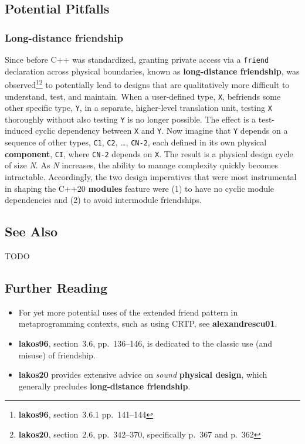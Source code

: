 \subsection[Potential Pitfalls]{Potential Pitfalls}\label{potential-pitfalls-extendedfriend}

\subsubsection[Long-distance friendship]{Long-distance friendship}\label{long-distance-friendship}

Since before C++ was standardized, granting private access via a
\texttt{friend} declaration across physical boundaries, known as
\textbf{long-distance friendship}, was
observed{\cprotect\footnote{\textbf{lakos96}, section~3.6.1
pp.~141--144}}{\cprotect\footnote{\textbf{lakos20}, section~2.6,
pp.~342--370, specifically p.~367 and p.~362}} to potentially lead
to designs that are qualitatively more difficult to understand, test,
and maintain. When a user-defined type, \texttt{X}, befriends some other
specific type, \texttt{Y}, in a separate, higher-level translation unit,
testing \texttt{X} thoroughly without also testing \texttt{Y} is no
longer possible. The effect is a test-induced cyclic dependency between
\texttt{X} and \texttt{Y}. Now imagine that \texttt{Y} depends on a
sequence of other types, \texttt{C1}, \texttt{C2}, \ldots,
\texttt{CN-2}, each defined in its own physical \textbf{component},
\texttt{CI}, where \texttt{CN-2} depends on \texttt{X}. The result is a
physical design cycle of size \emph{N}. As \emph{N} increases, the
ability to manage complexity quickly becomes intractable. Accordingly,
the two design imperatives that were most instrumental in shaping the
C++20 \textbf{modules} feature were (1) to have no cyclic module
dependencies and (2) to avoid intermodule friendships.

\subsection[See Also]{See Also}\label{see-also}

TODO

\subsection[Further Reading]{Further Reading}\label{further-reading}

\begin{itemize}
\item{For yet more potential uses of the extended friend pattern in
metaprogramming contexts, such as using CRTP, see
\textbf{alexandrescu01}.}
\item{\textbf{lakos96}, section~3.6, pp.~136--146, is dedicated to the
classic use (and misuse) of friendship.}
\item{\textbf{{lakos20}} provides extensive advice on \emph{sound}
\textbf{physical design}, which generally precludes \textbf{long-distance
friendship}.}
\end{itemize}

